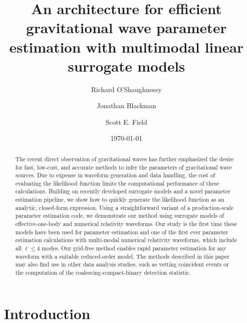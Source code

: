\documentclass[aps,prd,nofootinbib,showpacs,amssymb,twocolumn]{revtex4}
\begin{document}
%
\title{An architecture for efficient  gravitational wave parameter estimation with multimodal linear  surrogate models}
%
%
\date{\today}
\author{Richard O'Shaughnessy}

\author{Jonathan Blackman}

\author{Scott E. Field}

%
%

\begin{abstract}
%
%
The recent direct observation of gravitational waves has further emphasized the desire for fast, low-cost, and accurate methods to infer the parameters of gravitational wave sources. 
%
Due to expense in waveform generation and data handling, the cost of evaluating the likelihood function limits the computational performance of these calculations.
Building on  recently developed surrogate models and a novel parameter estimation pipeline, we show how to  quickly
generate the likelihood function as
%
an analytic, closed-form expression.  Using a 
%
straightforward
variant of a production-scale parameter
estimation code, we demonstrate our method using 
surrogate models of effective-one-body and numerical relativity waveforms.   Our study is the first time these models
have been used for parameter estimation and one of the first ever parameter estimation calculations with
multi-modal numerical relativity waveforms, which include all $\ell \leq 4$ modes.
%
%
%
%
Our  grid-free method enables rapid parameter estimation for any waveform with
a suitable reduced-order model.
%
%
%
%
The methods described in this paper may also find use in other data analysis 
%
studies, such as vetting coincident events or the computation of the coalescing-compact-binary detection statistic.
\end{abstract}
\maketitle
%
%
%
%
%


\section{Introduction}
\end{document}
